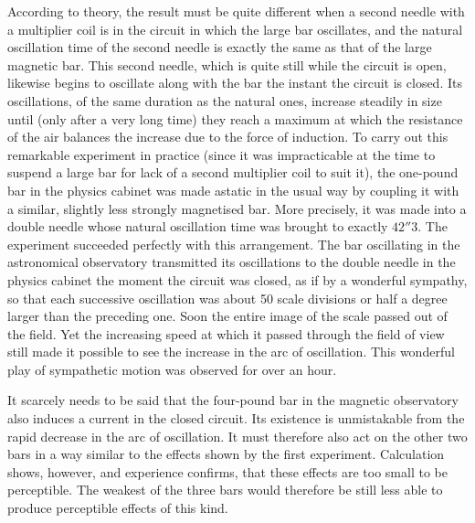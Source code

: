 According to theory, the result must be quite different when a second needle with a multiplier coil is in the circuit in which the large bar oscillates, and the natural oscillation time of the second needle is exactly the same as that of the large magnetic bar. This second needle, which is quite still
while the circuit is open, likewise begins to oscillate along with the bar the instant the circuit is closed. Its oscillations, of the same duration as the natural ones, increase steadily in size until (only after a very long time) they reach a maximum at which the resistance of the air balances the increase due to the force of induction. To carry out this remarkable experiment in practice (since it was impracticable at the time to suspend a large bar for lack of a second multiplier coil to suit it), the one-pound bar in the physics cabinet was made astatic in the usual way by coupling it with a similar, slightly less strongly magnetised bar. More precisely, it was made into a double needle whose natural oscillation time was brought to exactly $42''3$. The experiment succeeded perfectly with this arrangement. The bar oscillating in the astronomical observatory transmitted its oscillations to the double needle in the physics cabinet the moment the circuit was closed, as if by a wonderful sympathy, so that each successive oscillation was about 50 scale divisions or half a degree larger than the preceding one. Soon the entire image of the scale passed out of the field. Yet the increasing speed at which it passed through the field of view still made it possible to see the increase in the arc of oscillation. This wonderful play of sympathetic motion was observed for over an hour.

It scarcely needs to be said that the four-pound bar in the magnetic observatory also induces a current in the closed circuit. Its existence is unmistakable from the rapid decrease in the arc of oscillation. It must therefore also act on the other two bars in a way similar to the effects shown by the first experiment. Calculation shows, however, and experience confirms, that these effects are too small to be perceptible. The weakest of the three bars would therefore be still less able to produce perceptible effects of this kind.

\clearpage
